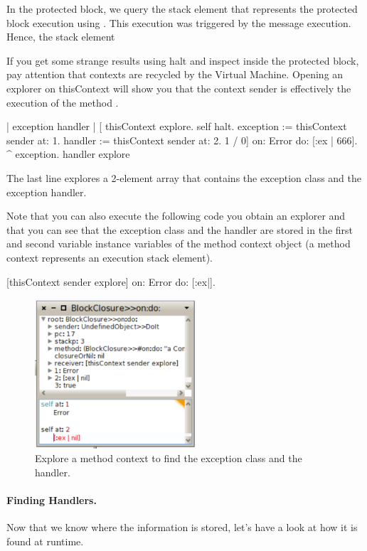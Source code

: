 \documentclass[a4paper,10pt,twoside]{book}
\begin{document}
In the protected block, we query the stack element that represents the protected block execution using . This execution was triggered by the  message execution. Hence, the stack element 

If you get some strange results using halt and inspect inside the protected block, pay attention that contexts are recycled by the Virtual Machine. Opening an explorer on thisContext will show you that the context sender is effectively the execution of the method . 

\begin{code}{}
| exception handler |
	[ thisContext  explore. 
	self halt.
	exception := thisContext  sender at: 1.
	handler := thisContext sender at: 2.
	1 / 0]
		on: Error
		do: [:ex | 666].
	^ {exception. handler} explore
\end{code}


The last line explores a 2-element array that contains the exception class and the exception handler. 

Note that you can also execute the following code you obtain an explorer and that you can see that the exception class and the handler are stored in the first and second variable instance variables of the method context object (a method context represents an execution stack element).

\begin{code}{}
[thisContext sender explore] on: Error do: [:ex|].
\end{code}

\begin{figure}[ht]\centering
        \includegraphics[width=6cm]{exception}
        \caption{Explore a method context to find the exception class and the handler.}
\end{figure}



\paragraph{Finding Handlers.}
Now that we know where the information is stored, let's have a look at how it is found at runtime. 
\end{document}
